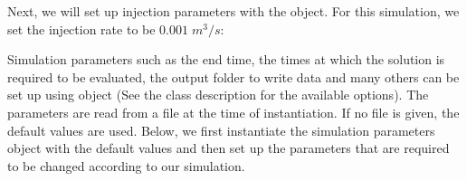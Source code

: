 \documentclass[letterpaper,10pt,english]{sphinxmanual}
\begin{document}
\sphinxAtStartPar
Next, we will set up injection parameters with the  object. For this simulation, we set the injection rate to be \(0.001\;m^3/s\):

\begin{sphinxVerbatim}[commandchars=\\\{\}]
    

    
   
\end{sphinxVerbatim}

\sphinxAtStartPar
Simulation parameters such as the end time, the times at which the solution is required to be evaluated, the output folder to write data and many others can be set up using  object (See the class description for the available options). The parameters are read from a file at the time of instantiation. If no file is given, the default values are used. Below, we first instantiate the simulation parameters object with the default values and then set up the parameters that are required to be changed according to our simulation.

\begin{sphinxVerbatim}[commandchars=\\\{\}]
   

  
                        
      
\end{sphinxVerbatim}
\end{document}
